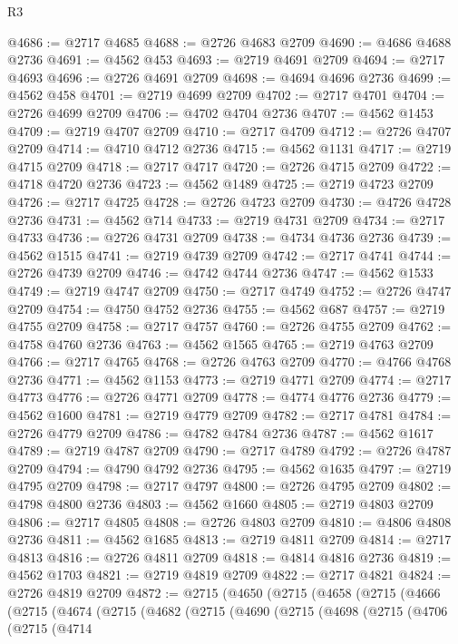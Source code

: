 \begin{lexlean}{R3}
\begin{coremodule}
@4686 := @2717 @4685
@4688 := @2726 @4683 @2709
@4690 := @4686 @4688 @2736
@4691 := @4562 @453
@4693 := @2719 @4691 @2709
@4694 := @2717 @4693
@4696 := @2726 @4691 @2709
@4698 := @4694 @4696 @2736
@4699 := @4562 @458
@4701 := @2719 @4699 @2709
@4702 := @2717 @4701
@4704 := @2726 @4699 @2709
@4706 := @4702 @4704 @2736
@4707 := @4562 @1453
@4709 := @2719 @4707 @2709
@4710 := @2717 @4709
@4712 := @2726 @4707 @2709
@4714 := @4710 @4712 @2736
@4715 := @4562 @1131
@4717 := @2719 @4715 @2709
@4718 := @2717 @4717
@4720 := @2726 @4715 @2709
@4722 := @4718 @4720 @2736
@4723 := @4562 @1489
@4725 := @2719 @4723 @2709
@4726 := @2717 @4725
@4728 := @2726 @4723 @2709
@4730 := @4726 @4728 @2736
@4731 := @4562 @714
@4733 := @2719 @4731 @2709
@4734 := @2717 @4733
@4736 := @2726 @4731 @2709
@4738 := @4734 @4736 @2736
@4739 := @4562 @1515
@4741 := @2719 @4739 @2709
@4742 := @2717 @4741
@4744 := @2726 @4739 @2709
@4746 := @4742 @4744 @2736
@4747 := @4562 @1533
@4749 := @2719 @4747 @2709
@4750 := @2717 @4749
@4752 := @2726 @4747 @2709
@4754 := @4750 @4752 @2736
@4755 := @4562 @687
@4757 := @2719 @4755 @2709
@4758 := @2717 @4757
@4760 := @2726 @4755 @2709
@4762 := @4758 @4760 @2736
@4763 := @4562 @1565
@4765 := @2719 @4763 @2709
@4766 := @2717 @4765
@4768 := @2726 @4763 @2709
@4770 := @4766 @4768 @2736
@4771 := @4562 @1153
@4773 := @2719 @4771 @2709
@4774 := @2717 @4773
@4776 := @2726 @4771 @2709
@4778 := @4774 @4776 @2736
@4779 := @4562 @1600
@4781 := @2719 @4779 @2709
@4782 := @2717 @4781
@4784 := @2726 @4779 @2709
@4786 := @4782 @4784 @2736
@4787 := @4562 @1617
@4789 := @2719 @4787 @2709
@4790 := @2717 @4789
@4792 := @2726 @4787 @2709
@4794 := @4790 @4792 @2736
@4795 := @4562 @1635
@4797 := @2719 @4795 @2709
@4798 := @2717 @4797
@4800 := @2726 @4795 @2709
@4802 := @4798 @4800 @2736
@4803 := @4562 @1660
@4805 := @2719 @4803 @2709
@4806 := @2717 @4805
@4808 := @2726 @4803 @2709
@4810 := @4806 @4808 @2736
@4811 := @4562 @1685
@4813 := @2719 @4811 @2709
@4814 := @2717 @4813
@4816 := @2726 @4811 @2709
@4818 := @4814 @4816 @2736
@4819 := @4562 @1703
@4821 := @2719 @4819 @2709
@4822 := @2717 @4821
@4824 := @2726 @4819 @2709
@4872 := @2715
    (@4650
      (@2715
        (@4658
          (@2715
            (@4666
              (@2715
                (@4674
                  (@2715
                    (@4682
                      (@2715
                        (@4690
                          (@2715
                            (@4698
                              (@2715
                                (@4706
                                  (@2715
                                    (@4714

\end{coremodule}
\end{lexlean}
